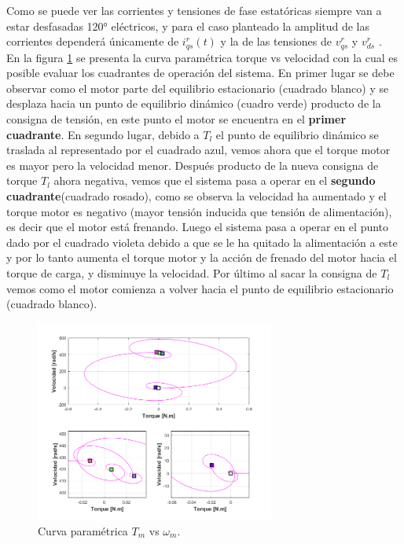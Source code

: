 \documentclass[10pt]{article}
\begin{document}
\begin{itemize}
	Como se puede ver las corrientes y tensiones de fase estatóricas siempre van a estar desfasadas 120° eléctricos, y para el caso planteado la amplitud de las corrientes dependerá únicamente de $i^{r}_{qs}(t)$ y la de las tensiones de $v^{r}_{qs}$ y $v^{r}_{ds}$  .\\
	En la figura \ref{fig:T vs velocidad} se presenta la curva paramétrica torque vs velocidad con la cual es posible evaluar los cuadrantes de operación del sistema. En primer lugar se debe observar como el motor parte del equilibrio estacionario (cuadrado blanco) y se desplaza hacia un punto de equilibrio dinámico (cuadro verde) producto de la consigna de tensión, en este punto el motor se encuentra en el \textbf{primer cuadrante}. En segundo lugar, debido a $T_{l}$ el punto de equilibrio dinámico se traslada al representado por el cuadrado azul, vemos ahora que el torque motor es mayor pero la velocidad menor. Después producto de la nueva consigna de torque $T_{l}$ ahora negativa, vemos que el sistema pasa a operar en el \textbf{segundo cuadrante}(cuadrado rosado), como se observa la velocidad ha aumentado y el torque motor es negativo (mayor tensión inducida que tensión de alimentación), es decir que el motor está frenando. Luego el sistema pasa a operar en el punto dado por el cuadrado violeta debido a que se le ha quitado la alimentación a este y por lo tanto aumenta el torque motor y la acción de frenado del motor hacia el torque de carga, y disminuye la velocidad. Por último al sacar la consigna de $T_{l}$ vemos como el motor comienza a volver hacia el punto de equilibrio estacionario (cuadrado blanco).
	
	\begin{figure}[h!]
		\centering
		\includegraphics[width=0.7\textwidth]{T_vs_velocidad.png}
		\caption{\label{fig:T vs velocidad} Curva paramétrica $T_{m}$ vs $\omega_{m}$.}
	\end{figure}



\end{itemize}
\end{document}
